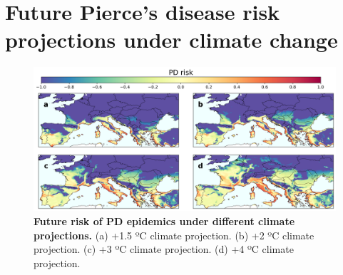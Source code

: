 \section{Future Pierce’s disease risk projections under climate change}

\begin{figure}[H]
    \centering
    \includegraphics[width=\textwidth]{Figures/Future_risk_vector.pdf}
    \caption[Future risk of PD epidemics under different climate
        projections]{\textbf{Future risk of PD epidemics under different
            climate
            projections.} (a) +1.5 ºC climate projection. (b) +2 ºC climate
        projection. (c)
        +3 ºC climate projection. (d) +4 ºC climate projection.}
    \label{fig:PD_future_risk}
\end{figure}

\begin{table}[H]
    \centering
    \caption[Risk velocity statistics for each climate projection]{Some risk
        velocity statistics for each climate projection.}
    \label{tab:risk_vel}
\end{table}


